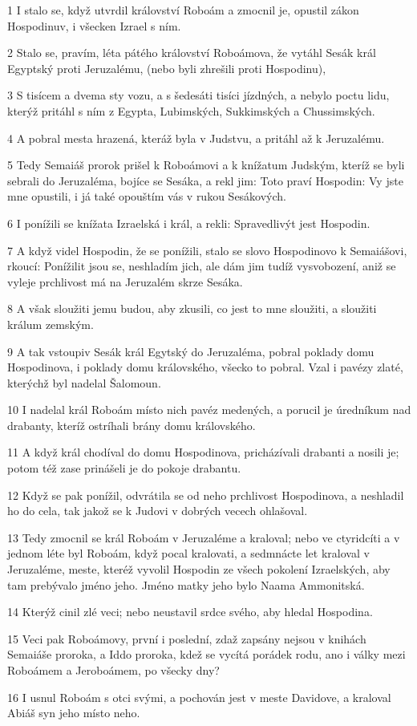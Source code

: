 \par 1 I stalo se, když utvrdil království Roboám a zmocnil je, opustil zákon Hospodinuv, i všecken Izrael s ním.
\par 2 Stalo se, pravím, léta pátého království Roboámova, že vytáhl Sesák král Egyptský proti Jeruzalému, (nebo byli zhrešili proti Hospodinu),
\par 3 S tisícem a dvema sty vozu, a s šedesáti tisíci jízdných, a nebylo poctu lidu, kterýž pritáhl s ním z Egypta, Lubimských, Sukkimských a Chussimských.
\par 4 A pobral mesta hrazená, kteráž byla v Judstvu, a pritáhl až k Jeruzalému.
\par 5 Tedy Semaiáš prorok prišel k Roboámovi a k knížatum Judským, kteríž se byli sebrali do Jeruzaléma, bojíce se Sesáka, a rekl jim: Toto praví Hospodin: Vy jste mne opustili, i já také opouštím vás v rukou Sesákových.
\par 6 I ponížili se knížata Izraelská i král, a rekli: Spravedlivýt jest Hospodin.
\par 7 A když videl Hospodin, že se ponížili, stalo se slovo Hospodinovo k Semaiášovi, rkoucí: Ponížilit jsou se, neshladím jich, ale dám jim tudíž vysvobození, aniž se vyleje prchlivost má na Jeruzalém skrze Sesáka.
\par 8 A však sloužiti jemu budou, aby zkusili, co jest to mne sloužiti, a sloužiti králum zemským.
\par 9 A tak vstoupiv Sesák král Egytský do Jeruzaléma, pobral poklady domu Hospodinova, i poklady domu královského, všecko to pobral. Vzal i pavézy zlaté, kterýchž byl nadelal Šalomoun.
\par 10 I nadelal král Roboám místo nich pavéz medených, a porucil je úredníkum nad drabanty, kteríž ostríhali brány domu královského.
\par 11 A když král chodíval do domu Hospodinova, pricházívali drabanti a nosili je; potom též zase prinášeli je do pokoje drabantu.
\par 12 Když se pak ponížil, odvrátila se od neho prchlivost Hospodinova, a neshladil ho do cela, tak jakož se k Judovi v dobrých vecech ohlašoval.
\par 13 Tedy zmocnil se král Roboám v Jeruzaléme a kraloval; nebo ve ctyridcíti a v jednom léte byl Roboám, když pocal kralovati, a sedmnácte let kraloval v Jeruzaléme, meste, kteréž vyvolil Hospodin ze všech pokolení Izraelských, aby tam prebývalo jméno jeho. Jméno matky jeho bylo Naama Ammonitská.
\par 14 Kterýž cinil zlé veci; nebo neustavil srdce svého, aby hledal Hospodina.
\par 15 Veci pak Roboámovy, první i poslední, zdaž zapsány nejsou v knihách Semaiáše proroka, a Iddo proroka, kdež se vycítá porádek rodu, ano i války mezi Roboámem a Jeroboámem, po všecky dny?
\par 16 I usnul Roboám s otci svými, a pochován jest v meste Davidove, a kraloval Abiáš syn jeho místo neho.

